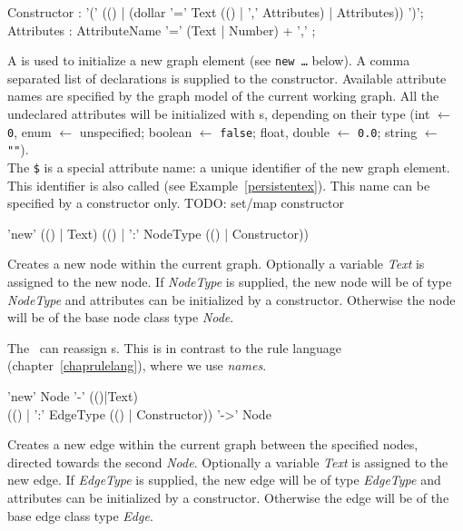 \begin{rail}
  Constructor : '(' (() | (dollar '=' Text (() | ',' Attributes) | Attributes)) ')';
  Attributes : AttributeName '=' (Text | Number) + ',' ;
\end{rail}\indexmain{\texttt{\$}}
A  is used to initialize a new graph element (see \texttt{new \dots} below). A comma separated list of  declarations is supplied to the constructor. Available attribute names are specified by the graph model of the current working graph. All the undeclared attributes will be initialized with s, depending on their type (int $\leftarrow$ \texttt{0}, enum $\leftarrow$ unspecified; boolean $\leftarrow$ \texttt{false}; float, double $\leftarrow$ \texttt{0.0}; string $\leftarrow$ \texttt{""}).\\
The \texttt{\$} is a special attribute name: a unique identifier of the new graph element. This identifier is also called  (see Example~\ref{persistentex}). This name can be specified by a constructor only.
TODO: set/map constructor

\begin{rail}
  'new' (() | Text) (() | ':' NodeType (() | Constructor))
\end{rail}
Creates a new node within the current graph. Optionally a variable \emph{Text} is assigned to the new node. If \emph{NodeType} is supplied, the new node will be of type \emph{NodeType} and attributes can be initialized by a constructor. Otherwise the node will be of the base node class type \emph{Node}.
\begin{note}
The \GrShell\ can reassign s. 
This is in contrast to the rule language (chapter~\ref{chaprulelang}), where we use \emph{names}.
\end{note}

\begin{rail}
  'new' Node '-' (()|Text) \\ (() | ':' EdgeType (() | Constructor)) '->' Node
\end{rail}
Creates a new edge within the current graph between the specified nodes, directed towards the second \emph{Node}. Optionally a variable \emph{Text} is assigned to the new edge. If \emph{EdgeType} is supplied, the new edge will be of type \emph{EdgeType} and attributes can be initialized by a constructor. Otherwise the edge will be of the base edge class type \emph{Edge}.

